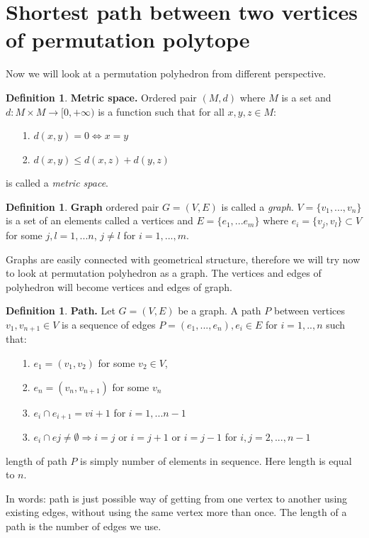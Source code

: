 \documentclass[11pt]{article}
\theoremstyle{plain}
\theoremstyle{definition}
\newtheorem{definition}[thm]{Definition}
\renewcommand\leq{\leqslant}
\begin{document}
\section{Shortest path between two vertices of permutation polytope}
Now we will look at a permutation polyhedron from different perspective.
\begin{definition}
    \textbf{Metric space.}
    Ordered pair $(M,d)$ where $M$ is a set and $d: M \times M \rightarrow [0, +\infty)$ is a function  such that for all $x,y,z \in M$:
    \begin{enumerate}
        \item[1.] $d(x,y)=0 \Leftrightarrow x=y $
        \item[2.] $d(x,y) \leq d(x,z) + d(y,z)$    
    \end{enumerate}
    is called a \textit{metric space}.
\end{definition}
\begin{definition}
    \textbf{Graph}
    ordered pair $G=(V,E)$ is called a \textit{graph}. $V = \{v_1,...,v_n \}$ is a set of an elements called a vertices and $E = \{ e_1,...e_m \} $ where $e_i = \{v_j,v_l\} \subset V$ for some $j,l = 1,...n$, $j\neq l$ for  $i=1,...,m$.  
\end{definition}
Graphs are easily connected with geometrical structure, therefore we will try now to look at permutation polyhedron as a graph. The vertices and edges of polyhedron will become vertices and edges of graph. 
\begin{definition}
    \textbf{Path.}
    Let $G = (V,E)$ be a graph. A path $P$ between vertices $v_{1},v_{n+1} \in V$ is a sequence of edges $P = (e_{1},...,e_{n}), e_{i} \in E$ for $i=1,..,n$ such that:
    \begin{enumerate}
        \item[1.] $e_{1} = (v_{1},v_{2})$ for some $v_{2} \in V$,
        \item[2.] $e_{n} = (v_n,v_{n+1})$ for some $v_{n}$
        \item[3.] $e_{i} \cap e_{i+1} = v{i+1}$ for $i=1,...n-1$
        \item[3.] $e_{i} \cap e{j} \neq \emptyset \Rightarrow i=j$ or $i=j+1$ or $i = j-1$ for $i,j =2,...,n-1$
    \end{enumerate}
    length of path $P$ is simply number of elements in sequence. Here length is equal to $n$.
\end{definition}
In words: path is just possible way of getting from one vertex to another using existing edges, without using the same vertex more than once. The length of a path is the number of edges we use.
\end{document}
